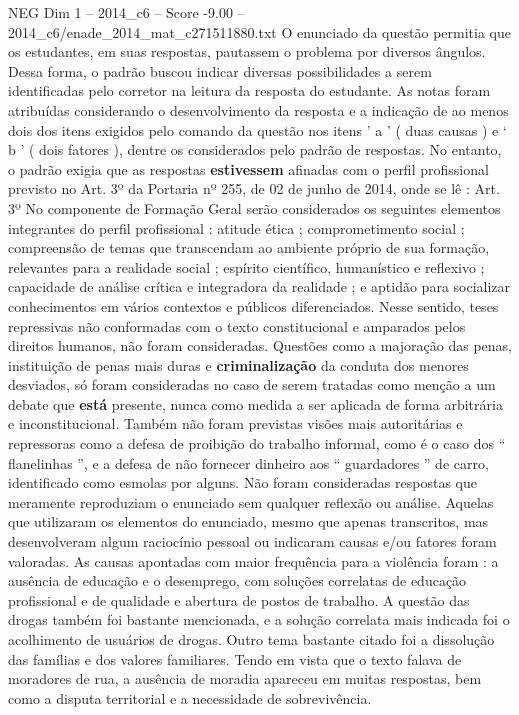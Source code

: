 \begin{textsample}{NEG Dim 1 – 2014\_c6 – Score -9.00 – 2014\_c6/enade\_2014\_mat\_c271511880.txt}
O enunciado da questão permitia que os estudantes, em suas respostas, pautassem o problema por diversos ângulos.
Dessa forma, o padrão buscou indicar diversas possibilidades a serem identificadas pelo corretor na leitura da resposta do estudante.
As notas foram atribuídas considerando o desenvolvimento da resposta e a indicação de ao menos dois dos itens exigidos pelo comando da questão nos itens ’ a ’ ( duas causas ) e ‘ b ’ ( dois fatores ), dentre os considerados pelo padrão de respostas.
No entanto, o padrão exigia que as respostas \textbf{estivessem} afinadas com o perfil profissional previsto no Art. 3º da Portaria nº 255, de 02 de junho de 2014, onde se lê : Art. 3º No componente de Formação Geral serão considerados os seguintes elementos integrantes do perfil profissional : atitude ética ; comprometimento social ; compreensão de temas que transcendam ao ambiente próprio de sua formação, relevantes para a realidade social ; espírito científico, humanístico e reflexivo ; capacidade de análise crítica e integradora da realidade ; e aptidão para socializar conhecimentos em vários contextos e públicos diferenciados.
Nesse sentido, teses repressivas não conformadas com o texto constitucional e amparados pelos direitos humanos, não foram consideradas.
Questões como a majoração das penas, instituição de penas mais duras e \textbf{criminalização} da conduta dos menores desviados, só foram consideradas no caso de serem tratadas como menção a um debate que \textbf{está} presente, nunca como medida a ser aplicada de forma arbitrária e inconstitucional.
Também não foram previstas visões mais autoritárias e repressoras como a defesa de proibição do trabalho informal, como é o caso dos “ flanelinhas ”, e a defesa de não fornecer dinheiro aos “ guardadores ” de carro, identificado como esmolas por alguns.
Não foram consideradas respostas que meramente reproduziam o enunciado sem qualquer reflexão ou análise.
Aquelas que utilizaram os elementos do enunciado, mesmo que apenas transcritos, mas desenvolveram algum raciocínio pessoal ou indicaram causas e/ou fatores foram valoradas.
As causas apontadas com maior frequência para a violência foram : a ausência de educação e o desemprego, com soluções correlatas de educação profissional e de qualidade e abertura de postos de trabalho.
A questão das drogas também foi bastante mencionada, e a solução correlata mais indicada foi o acolhimento de usuários de drogas.
Outro tema bastante citado foi a dissolução das famílias e dos valores familiares.
Tendo em vista que o texto falava de moradores de rua, a ausência de moradia apareceu em muitas respostas, bem como a disputa territorial e a necessidade de sobrevivência.

\end{textsample}
